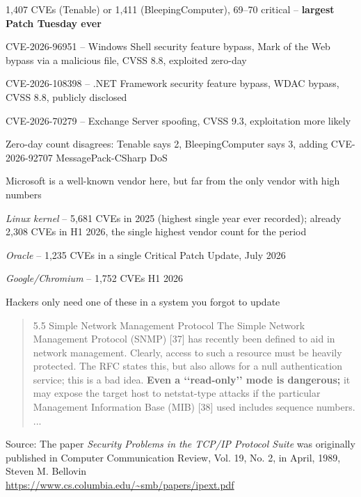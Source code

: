 \documentclass[Screen16to9,17pt]{foils}
\begin{document}
\begin{list2}
\item 1,407 CVEs (Tenable) or 1,411 (BleepingComputer), 69--70 critical -- {\bf largest Patch Tuesday ever}
\item CVE-2026-96951 -- Windows Shell security feature bypass, Mark of the Web bypass via a malicious file, CVSS 8.8, exploited zero-day
\item CVE-2026-108398 -- .NET Framework security feature bypass, WDAC bypass, CVSS 8.8, publicly disclosed
\item CVE-2026-70279 -- Exchange Server spoofing, CVSS 9.3, exploitation more likely\\
\item Zero-day count disagrees: Tenable says 2, BleepingComputer says 3, adding CVE-2026-92707 MessagePack-CSharp DoS\\
{\footnotesize {}}
\end{list2}


\begin{list2}
\item Microsoft is a well-known vendor here, but far from the only vendor with high numbers
\item \emph{Linux kernel} -- 5{,}681 CVEs in 2025 (highest single year ever recorded); already 2{,}308 CVEs in H1 2026, the single highest vendor count for the period\\
\item \emph{Oracle} -- 1{,}235 CVEs in a single Critical Patch Update, July 2026
\item \emph{Google/Chromium} -- 1{,}752 CVEs H1 2026
\item Hackers only need one of these in a system you forgot to update
\end{list2}



\begin{quote}
5.5 Simple Network Management Protocol
The Simple Network Management Protocol (SNMP) [37] has recently been defined to aid in network
management. Clearly, access to such a resource must be heavily protected. The RFC states this, but
also allows for a null authentication service; this is a bad idea. {\bf Even a ‘‘read-only’’ mode is dangerous;}
it may expose the target host to netstat-type attacks if the particular Management Information Base
(MIB) [38] used includes sequence numbers. ...
\end{quote}
Source: The paper \emph{Security Problems in the TCP/IP Protocol Suite} was originally\\
published in Computer Communication Review, Vol. 19, No. 2, in April, 1989, Steven M. Bellovin\\
\url{https://www.cs.columbia.edu/~smb/papers/ipext.pdf}
\end{document}
